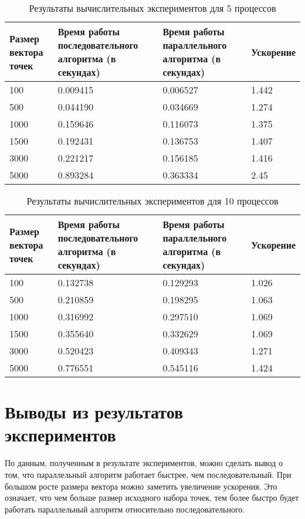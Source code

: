 \documentclass{report}
\begin{document}
\begin{table}[!h]
\caption{Результаты вычислительных экспериментов для 5 процессов}
\centering
\begin{tabular}{| p{2cm} | p{3cm} | p{4cm} | p{2cm} |}
\hline
Размер вектора точек & Время работы последовательного алгоритма (в секундах) & Время работы параллельного алгоритма (в секундах) & Ускорение  \\[5pt]
\hline
100        & 0.009415   & 0.006527    & 1.442      \\
500       & 0.044190    & 0.034669     & 1.274       \\
1000       & 0.159646    & 0.116073     & 1.375      \\
1500       &  0.192431    & 0.136753    & 1.407       \\
3000       & 0.221217     & 0.156185     & 1.416       \\
5000       & 0.893284   & 0.363334    & 2.45      \\
\hline
\end{tabular}
\end{table}

\begin{table}[!h]
\caption{Результаты вычислительных экспериментов для 10 процессов}
\centering
\begin{tabular}{| p{2cm} | p{3cm} | p{4cm} | p{2cm} |}
\hline
Размер вектора точек & Время работы последовательного алгоритма (в секундах) & 
Время работы параллельного алгоритма (в секундах) & Ускорение  \\[5pt]
\hline
100        & 0.132738    & 0.129293    & 1.026       \\
500       & 0.210859    &  0.198295     & 1.063       \\
1000       & 0.316992    & 0.297510     & 1.069       \\
1500       & 0.355640    & 0.332629     & 1.069       \\
3000       & 0.520423    & 0.409343      & 1.271       \\
5000       & 0.776551    & 0.545116      & 1.424       \\
\hline
\end{tabular}
\end{table}

\newpage

\section*{Выводы из результатов экспериментов}
По данным, полученным в результате экспериментов, можно сделать вывод о том, что параллельный алгоритм работает быстрее, чем последовательный. При большом росте размера вектора можно заметить увеличение ускорения. Это означает, что чем больше размер исходного набора точек, тем более быстро будет работать параллельный алгоритм относительно последовательного. 
\end{document}
